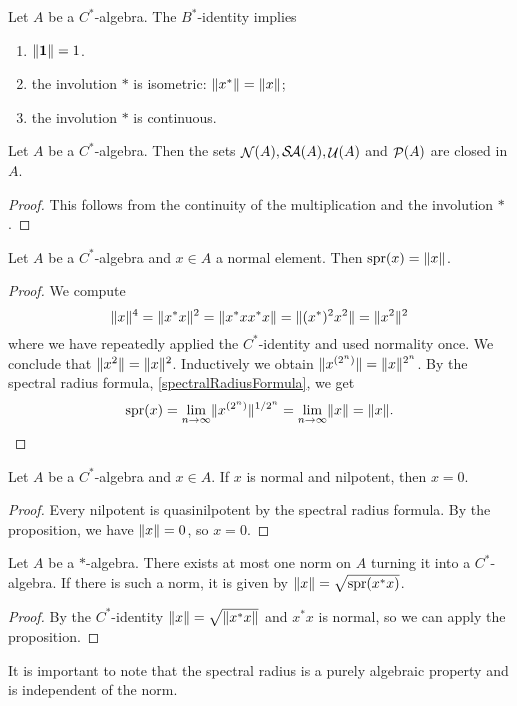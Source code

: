 \begin{lemma} \label{consequencesC*}
Let $A$ be a $C^*$-algebra. The $B^*$-identity implies
\begin{enumerate}
\item  $\lVert\boldsymbol{\mathrm{1}}\rVert = 1$.
\item the involution $*$ is isometric: $\lVert x^*\rVert = \lVert x\rVert$;
\item the involution $*$ is continuous.
\end{enumerate}
\end{lemma}

\begin{lemma}
Let $A$ be a $C^*$-algebra. Then the sets $\mathop{\mathcal{N}}\nolimits(A), \mathop{\mathcal{S}\hspace{-0.15em}\mathcal{A}}\nolimits(A), \mathop{\mathcal{U}}\nolimits(A)$ and $\mathop{\mathcal{P}}\nolimits(A)$ are closed in $A$. 
\end{lemma}
\begin{proof}
This follows from the continuity of the multiplication and the involution $*$.
\end{proof}

\begin{proposition} \label{normNormalElement}
Let $A$ be a $C^*$-algebra and $x\in A$ a normal element. Then $\operatorname{spr}(x) = \lVert x\rVert$.
\end{proposition}
\begin{proof}
We compute
\[ \lVert x\rVert^4 = \lVert x^*x\rVert^2 = \lVert x^*xx^*x\rVert = \lVert(x^*)^2x^2\rVert = \lVert x^2\rVert^2 \]
where we have repeatedly applied the $C^*$-identity and used normality once. We conclude that $\lVert x^2\rVert = \lVert x\rVert^2$. Inductively we obtain $\lVert x^{(2^n)}\rVert = \lVert x\rVert^{2^n}$. By the spectral radius formula, \ref{spectralRadiusFormula}, we get
\[ \operatorname{spr}(x) = \lim_{n\to\infty}\lVert x^{(2^n)}\rVert^{1/2^n} = \lim_{n\to\infty}\lVert x\rVert = \lVert x\rVert. \]
\end{proof}
\begin{corollary}
Let $A$ be a $C^*$-algebra and $x\in A$. If $x$ is normal and nilpotent, then $x=0$.
\end{corollary}
\begin{proof}
Every nilpotent is quasinilpotent by the spectral radius formula. By the proposition, we have $\lVert x\rVert = 0$, so $x=0$.
\end{proof}
\begin{corollary} \label{atMostOneNorm}
Let $A$ be a $*$-algebra. There exists at most one norm on $A$ turning it into a $C^*$-algebra. If there is such a norm, it is given by $\lVert x\rVert = \sqrt{\operatorname{spr}(x^*x)}$.
\end{corollary}
\begin{proof}
By the $C^*$-identity $\lVert x\rVert = \sqrt{\lVert x^*x\rVert}$ and $x^*x$ is normal, so we can apply the proposition.
\end{proof}
It is important to note that the spectral radius is a purely algebraic property and is independent of the norm.


